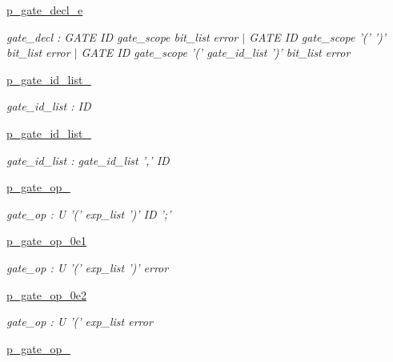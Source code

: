 \begin{DoxyCompactItemize}
\hyperlink{namespaceqat_1_1interop_1_1qasm__parser_1_1OqasmParser_1_1p__gate__decl__e}{p\-\_\-gate\-\_\-decl\-\_\-e}
\begin{DoxyCompactList}\small\item\em gate\-\_\-decl \-: G\-A\-T\-E I\-D gate\-\_\-scope bit\-\_\-list error $|$ G\-A\-T\-E I\-D gate\-\_\-scope '(' ')' bit\-\_\-list error $|$ G\-A\-T\-E I\-D gate\-\_\-scope '(' gate\-\_\-id\-\_\-list ')' bit\-\_\-list error \end{DoxyCompactList}\item 
\hyperlink{namespaceqat_1_1interop_1_1qasm__parser_1_1OqasmParser_1_1p__gate__id__list__0}{p\-\_\-gate\-\_\-id\-\_\-list\-\_}
\begin{DoxyCompactList}\small\item\em gate\-\_\-id\-\_\-list \-: I\-D \end{DoxyCompactList}\item 
\hyperlink{namespaceqat_1_1interop_1_1qasm__parser_1_1OqasmParser_1_1p__gate__id__list__1}{p\-\_\-gate\-\_\-id\-\_\-list\-\_}
\begin{DoxyCompactList}\small\item\em gate\-\_\-id\-\_\-list \-: gate\-\_\-id\-\_\-list ',' I\-D \end{DoxyCompactList}\item 
\hyperlink{namespaceqat_1_1interop_1_1qasm__parser_1_1OqasmParser_1_1p__gate__op__0}{p\-\_\-gate\-\_\-op\-\_}
\begin{DoxyCompactList}\small\item\em gate\-\_\-op \-: U '(' exp\-\_\-list ')' I\-D ';' \end{DoxyCompactList}\item 
\hyperlink{namespaceqat_1_1interop_1_1qasm__parser_1_1OqasmParser_1_1p__gate__op__0e1}{p\-\_\-gate\-\_\-op\-\_\-0e1}
\begin{DoxyCompactList}\small\item\em gate\-\_\-op \-: U '(' exp\-\_\-list ')' error \end{DoxyCompactList}\item 
\hyperlink{namespaceqat_1_1interop_1_1qasm__parser_1_1OqasmParser_1_1p__gate__op__0e2}{p\-\_\-gate\-\_\-op\-\_\-0e2}
\begin{DoxyCompactList}\small\item\em gate\-\_\-op \-: U '(' exp\-\_\-list error \end{DoxyCompactList}\item 
\hyperlink{namespaceqat_1_1interop_1_1qasm__parser_1_1OqasmParser_1_1p__gate__op__1}{p\-\_\-gate\-\_\-op\-\_}

\end{DoxyCompactItemize}
